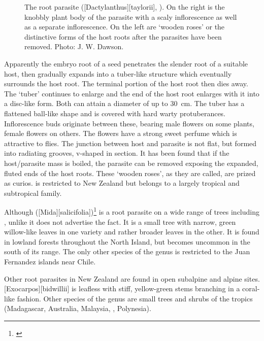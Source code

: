 \begin{figure}[!t]
\begin{minipage}[t]{\textwidth}
\begin{minipage}[t]{(\textwidth-\fgap) * \real{0.548}}
			\caption[The root parasite pua o te reinga (\emph{Dactylanthus taylorii})]{The root parasite  ([Dactylanthus][taylorii], ).
			On the right is the knobbly plant body of the parasite with a scaly inflorescence as well as a separate inflorescence.
			On the left are `wooden roses' or the distinctive forms of the host roots after the parasites have been removed.
			Photo: J. W. Dawson.}%
			\label{fig:58dactylanthus}
		\end{minipage}
	\end{minipage}
\end{figure}

Apparently the embryo root of a  seed penetrates the slender root of a suitable host, then gradually expands into a tuber-like structure which eventually surrounds the host root.
The terminal portion of the host root then dies away.
The `tuber' continues to enlarge and the end of the host root enlarges with it into a disc-like form.
Both can attain a diameter of up to \SI{30}{\centi\metre}.
The tuber has a flattened ball-like shape and is covered with hard warty protuberances.
Inflorescence buds originate between these, bearing male flowers on some plants, female flowers on others.
The flowers have a strong sweet perfume which is attractive to flies.
The junction between host and parasite is not flat, but formed into radiating grooves, v-shaped in section.
It has been found that if the host/parasite mass is boiled, the parasite can be removed exposing the expanded, fluted ends of the host roots.
These `wooden roses', as they are called, are prized as curios.  is restricted to New Zealand but belongs to a largely tropical and subtropical family.

Although  ([Mida][salicifolia])\footnote{\cite{philipson1959some}} is a root parasite on a wide range of trees including , unlike  it does not advertise the fact.
It is a small tree with narrow, green willow-like leaves in one variety and rather broader leaves in the other.
It is found in lowland forests throughout the North Island, but becomes uncommon in the south of its range.
The only other species of the genus is restricted to the Juan Fernandez islands near Chile.

Other root parasites in New Zealand are found in open subalpine and alpine sites. [Exocarpos][bidwillii] is leafless with stiff, yellow-green stems branching in a coral-like fashion.
Other species of the genus are small trees and shrubs of the tropics (Madagascar, Australia, Malaysia, , Polynesia).

